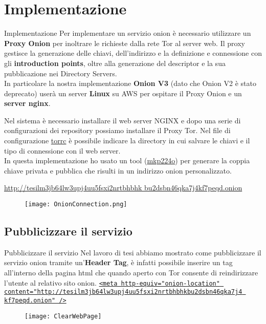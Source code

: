 \section{Implementazione}
\begin{frame}{Implementazione}
    Per implementare un servizio onion è necessario utilizzare un \textbf{Proxy Onion} per inoltrare le richieste dalla rete Tor al server web. Il proxy gestisce la generazione delle chiavi, dell'indirizzo e la definizione e connessione con gli \textbf{introduction points}, oltre alla generazione del descriptor e la sua pubblicazione nei Directory Servers. \\
    In particolare la nostra implementazione \textbf{Onion V3} (dato che Onion V2 è stato deprecato) userà un server \textbf{Linux} su AWS per ospitare il Proxy Onion e un \textbf{server nginx}.
\end{frame}

\begin{frame}
    Nel sistema è necessario installare il web server NGINX e dopo una serie di configurazioni dei repository possiamo installare il Proxy Tor. Nel file di configurazione \hyperref[torConfig]{torrc} è possibile indicare la directory in cui salvare le chiavi e il tipo di connessione con il web server. \\
    In questa implementazione ho usato un tool (\href{https://github.com/cathugger/mkp224o/}{mkp224o}) per generare la coppia chiave privata e pubblica che risulti in un indirizzo onion personalizzato.
\end{frame}

\begin{frame}
    \centering
    \href{http://tesilm3jb64lw3upj4uu5fsxi2nrtbhbhkbu2dsbn46qka7j4kf7peqd.onion}{http://tesilm3jb64lw3upj4uu5fsxi2nrtbhbhk bu2dsbn46qka7j4kf7peqd.onion}
    \begin{figure}
        \centering
        \texttt{[image: OnionConnection.png]}
    \end{figure}
\end{frame}

\subsection{Pubblicizzare il servizio}
\begin{frame}{Pubblicizzare il servizio}
    Nel lavoro di tesi abbiamo mostrato come pubblicizzare il servizio onion tramite un'\textbf{Header Tag}, è infatti possibile inserire un tag all'interno della pagina html che quando aperto con Tor consente di reindirizzare l'utente al relativo sito onion.
    \href{http://tesilm3jb64lw3upj4uu5fsxi2nrtbhbhkbu2dsbn46qka7j4kf7peqd.onion}{\lstinline{<meta http-equiv="onion-location" content="http://tesilm3jb64lw3upj4uu5fsxi2nrtbhbhkbu2dsbn46qka7j4 kf7peqd.onion" />}}
\end{frame}

\begin{frame}
    \begin{figure}
        \centering
        \texttt{[image: ClearWebPage]}
    \end{figure}
\end{frame}

